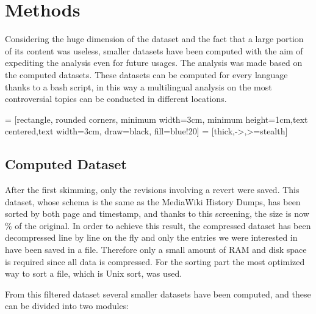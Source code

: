 \chapter{Methods}

Considering the huge dimension of the dataset and the fact that a large portion of its content was
useless, smaller datasets have been computed with the aim of expediting the analysis even for future
usages. The analysis was made based on the computed datasets. These datasets can be computed for
every language thanks to a bash script, in this way a multilingual analysis on the most
controversial topics can be conducted in different locations.


\bigskip



 = [rectangle, rounded corners, minimum width=3cm, minimum height=1cm,text centered,text width=3cm, draw=black, fill=blue!20]
 = [thick,->,>=stealth]


\bigskip

\section{Computed Dataset}
After the first skimming, only the revisions involving a revert were saved. This dataset, whose
schema is the same as the MediaWiki History Dumps, has been sorted by both page and timestamp, and
thanks to this screening, the size is now \% of the original. In order to achieve this result,
the compressed dataset has been decompressed line by line on the fly and only the entries we were
interested in have been saved in a file. Therefore only a small amount of RAM and disk space is
required since all data is compressed. For the sorting part the most optimized way to sort a file,
which is Unix sort, was used.  

From this filtered dataset several smaller datasets have been computed, and these can be divided into two modules: 


